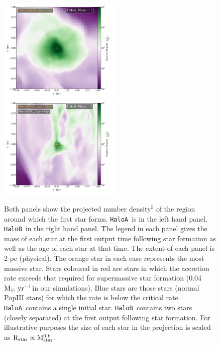 \documentclass[twocolumn,iop,revtex4]{openjournal}
\newcommand{\msolaryrc} {$\rm{M_{\odot}~yr^{-1}}$}
\newcommand{\ha} {\texttt{HaloA~}}
\newcommand{\hb} {\texttt{HaloB~}}
\begin{document}
\begin{figure} 
\centering
\begin{minipage}{175mm}      \begin{center} 
\centerline{
\includegraphics[width=0.52\textwidth]{FIGURES/HaloA/Proj_z_number_density_0001.pdf}
\includegraphics[width=0.52\textwidth]{FIGURES/HaloB/Proj_z_number_density_0028.pdf}}
\caption{Both panels show the projected number density$^5$ of the region around which the first
  star forms. \ha is in the left hand panel, \hb in the right hand panel.
  The legend in each panel gives the mass of each star at the first output time following star
  formation as well as the age of each star at that time. The extent of each panel is 2 pc (physical). The orange
  star in each case represents the most massive star. Stars coloured in red are stars in which the accretion rate
  exceeds that required for supermassive star formation (0.04 \msolaryrc in our simulations).
  Blue stars are those stars
  (normal PopIII stars) for
  which the rate is below the critical rate. \ha contains a single initial star. \hb contains two stars (closely separated)
  at the first output following star formation. For illustrative purposes the size of each star in the
projection is scaled as $\rm{R_{star}} \propto \rm{M_{star}^{0.6}}$.}\label{Fig:ProjectionStart}
\end{center} \end{minipage}

\end{figure}
\end{document}

